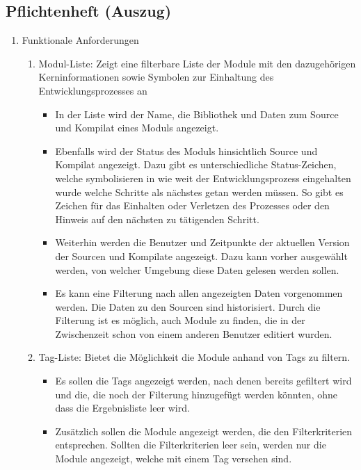 \subsection{Pflichtenheft (Auszug)}
\label{app:Pflichtenheft}

\begin{enumerate}[itemsep=0em,partopsep=0em,parsep=0em,topsep=0em]
\item Funktionale Anforderungen %
	\begin{enumerate}
	\item Modul-Liste: Zeigt eine filterbare Liste der Module mit den dazugehörigen Kerninformationen sowie Symbolen zur Einhaltung des Entwicklungsprozesses an
		\begin{itemize}
		\item In der Liste wird der Name, die Bibliothek und Daten zum Source und Kompilat eines Moduls angezeigt.
		\item Ebenfalls wird der Status des Moduls hinsichtlich Source und Kompilat angezeigt. Dazu gibt es unterschiedliche Status-Zeichen, welche symbolisieren in wie weit der Entwicklungsprozess eingehalten wurde \bzw welche Schritte als nächstes getan werden müssen. So gibt es \zB Zeichen für das Einhalten oder Verletzen des Prozesses oder den Hinweis auf den nächsten zu tätigenden Schritt. 
		\item Weiterhin werden die Benutzer und Zeitpunkte der aktuellen Version der Sourcen und Kompilate angezeigt. Dazu kann vorher ausgewählt werden, von welcher Umgebung diese Daten gelesen werden sollen. 
		\item Es kann eine Filterung nach allen angezeigten Daten vorgenommen werden. Die Daten zu den Sourcen sind historisiert. Durch die Filterung ist es möglich, auch Module zu finden, die in der Zwischenzeit schon von einem anderen Benutzer editiert wurden.
		\end{itemize}
	\item Tag-Liste: Bietet die Möglichkeit die Module anhand von Tags zu filtern. 
		\begin{itemize}
		\item Es sollen die Tags angezeigt werden, nach denen bereits gefiltert wird und die, die noch der Filterung hinzugefügt werden könnten, ohne dass die Ergebnisliste leer wird.
		\item Zusätzlich sollen die Module angezeigt werden, die den Filterkriterien entsprechen. Sollten die Filterkriterien leer sein, werden nur die Module angezeigt, welche mit einem Tag versehen sind.

\end{itemize}
\end{enumerate}
\end{enumerate}
